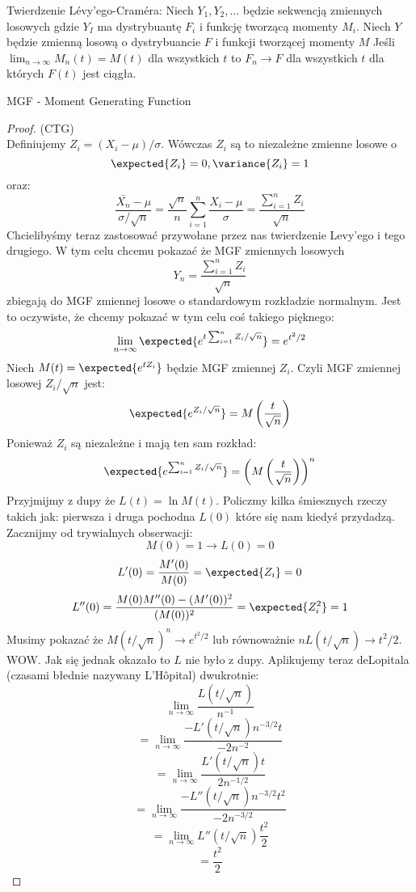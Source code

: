 \begin{theorem}
    Twierdzenie Lévy’ego-Craméra: Niech \( Y_1, Y_2, ...\)
    będzie sekwencją zmiennych losowych gdzie \(Y_I\) ma dystrybuantę \(F_i\) i funkcję tworzącą momenty \( M_i\). Niech \(Y\) będzie zmienną losową o dystrybuancie \(F\) i funkcji tworzącej momenty \(M\) 
    Jeśli \(\lim_{n \to \infty}M_n(t) = M(t)\) dla wszystkich \(t\) to \(F_n \to F\) dla wszystkich \(t\) dla których \( F(t)\) jest ciągła.
\end{theorem}
MGF - Moment Generating Function
\begin{proof}
    (CTG)\\
    Definiujemy \( Z_i = (X_i - \mu)/\sigma \).
    Wówczas \( Z_i\) są to niezależne zmienne losowe o \[\expected{Z_i} = 0, \variance{Z_i} = 1 \]
    oraz:
    \[
    \frac{\bar{X_n} - \mu}{\sigma/\sqrt{n}} = \frac{\sqrt{n}}{n}\sum_{i=1}^{n}\frac{X_i-\mu}{\sigma} = \frac{\sum_{i=1}^nZ_i}{\sqrt{n}}
    \]
    Chcielibyśmy teraz zastosować przywołane przez nas twierdzenie Levy'ego i tego drugiego.
    W tym celu chcemu pokazać że MGF zmiennych losowych 
    \[
    Y_n = \frac{\sum_{i=1}^nZ_i}{\sqrt{n}}
    \]
    zbiegają do MGF zmiennej losowe o standardowym rozkładzie normalnym.
    Jest to oczywiste, że chcemy pokazać w tym celu coś takiego pięknego:
    \[
    \lim_{n \to \infty}\expected{e^{t\sum_{i=1}^nZ_i/\sqrt{n}}} = e^{t^2/2}
    \]
    Niech \( M(t) = \expected{e^{tZ_i}} \) będzie MGF zmiennej \( Z_i\). Czyli MGF zmiennej losowej \( Z_i/\sqrt{n}\) jest:
    \[
    \expected{e^{Z_i/\sqrt{n}}} = M\left( \frac{t}{\sqrt{n}}\right)
    \]
    Ponieważ \( Z_i\) są niezależne i mają ten sam rozkład:
    \[
    \expected{e^{\sum_{i=1}^nZ_i/\sqrt{n}}} = \left(M\left( \frac{t}{\sqrt{n}}\right) \right)^n
    \]
    Przyjmijmy z dupy że \(L(t) = \ln{M(t)}\). Policzmy kilka śmiesznych rzeczy takich jak: pierwsza i druga pochodna \(L(0)\) które się nam kiedyś przydadzą.
    Zacznijmy od trywialnych obserwacji:
    \[
    M(0) = 1 \to L(0) = 0
    \]
    \[
    L'(0) = \frac{M'(0)}{M(0)} = \expected{Z_i} = 0
    \]
    \[
    L''(0) = \frac{M(0)M''(0) - (M'(0))^2}{(M(0))^2} = \expected{Z_i^2} = 1
    \]
    Musimy pokazać że \(M(t/\sqrt{n})^n \to e^{t^2/2}\) lub równoważnie \(nL(t/\sqrt{n}) \to t^2/2\). WOW. Jak się jednak okazało to \(L\) nie było z dupy.
    Aplikujemy teraz deLopitala (czasami błednie nazywany L’Hôpital) dwukrotnie:
    \[
    \lim_{n \to \infty}\frac{L(t/\sqrt{n})}{n^{-1}}
    \]
    \[
    =\lim_{n \to \infty}\frac{-L'(t/\sqrt{n})n^{-3/2}t}{-2n^{-2}}
    \]
    \[
    =\lim_{n \to \infty}\frac{L'(t/\sqrt{n})t}{2n^{-1/2}}
    \]
    \[
    =\lim_{n \to \infty}\frac{-L''(t/\sqrt{n})n^{-3/2}t^2}{-2n^{-3/2}}
    \]
    \[
    =\lim_{n \to \infty}L''(t/\sqrt{n})\frac{t^2}{2}
    \]
    \[
    =\frac{t^2}{2}
    \]
\end{proof}

